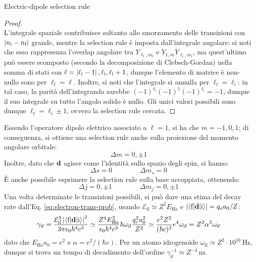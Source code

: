 \begin{theorem}{Electric-dipole selection rule}{}
\begin{proof}
\begin{equation*}
		\end{equation*}
		L'integrale spaziale contribuisce soltanto allo smorzamento delle transizioni con $ \left\lvert n_\text{i} - n_\text{f}\right\rvert $ grande, mentre la selection rule è imposta dall'integrale angolare: si noti che esso rappresenza l'overlap angolare tra $ Y_{\ell_\text{f} , m_\text{f}} $ e $ Y_{1,m} Y_{\ell_\text{i} , m_\text{i}} $, ma quest'ultimo può essere scomposto (secondo la decomposizione di Clebsch-Gordan) nella somma di stati con $ \ell = \left\lvert\ell_\text{i} - 1\right\rvert, \ell_\text{i}, \ell_\text{i} + 1 $, dunque l'elemento di matrice è non-nullo sono per $ \ell_\text{f} = \ell $. Inoltre, si noti che l'integrale si annulla per $ \ell_\text{f} = \ell_\text{i} $: in tal caso, la parità dell'integranda sarebbe $ (-1)^{\ell_\text{i}} (-1)^1 (-1)^{\ell_\text{i}} = -1 $, dunque il suo integrale su tutto l'angolo solido è nullo. Gli unici valori possibili sono dunque $ \ell_\text{f} = \ell_\text{i} \pm 1 $, ovvero la selection rule cercata.
	\end{proof}
\end{theorem}

Essendo l'operatore dipolo elettrico associato a $ \ell = 1 $, si ha che $ m = -1,0,1 $; di conseguenza, si ottiene una selection rule anche sulla proiezione del momento angolare orbitale:
\begin{equation}
	\Delta m = 0, \pm 1
	\label{eq:1-e-el-dip-tr-m}
\end{equation}
Inoltre, dato che $ \mathbf{d} $ agisce come l'identità sullo spazio degli spin, si hanno:
\begin{equation}
	\Delta s = 0
	\qquad \qquad
	\Delta m_s = 0
	\label{eq:1-e-el-dip-tr-spin}
\end{equation}
È anche possibile esprimere la selection rule sulla base accoppiata, ottenendo:
\begin{equation}
	\Delta j = 0 , \pm 1
	\qquad \qquad
	\Delta m_j = 0 , \pm 1
\end{equation}
Una volta determinate le transizioni possibili, si può dare una stima del decay rate dall'Eq. \ref{eq:electron-trans-prob}, usando $ \mathcal{E}_\text{if} \simeq Z^2 E_\text{Ha} $ e $ \left\lvert\braket{\text{f} | \mathbf{d} | \text{i}}\right\rvert = q_e a_0 / Z $:
\begin{equation}
	\gamma_\text{if} = \frac{\mathcal{E}_\text{if}^3 \left\lvert\braket{\text{f} | \mathbf{d} | \text{i}}\right\rvert^2}{3\pi \epsilon_0 \hbar^4 c^3} \simeq \frac{Z^4 E_\text{Ha}^2}{\epsilon_0 \hbar^4 c^3} \hbar \omega_\text{if} \frac{q_e^2 a_0^2}{Z^2} \simeq \frac{e^2 Z^2}{(\hbar c)^3} e^4 \omega_\text{if} = Z^2 \alpha^3 \omega_\text{if}
	\label{eq:electric-dipole-decay-rate}
\end{equation}
dato che $ E_\text{Ha} a_0 = e^2 $ e $ \alpha = e^2 / (\hbar c) $. Per un atomo idrogenoide $ \omega_\text{if} \simeq Z^2 \cdot 10^{16} \,\text{Hz} $, dunque si trova un tempo di decadimento dell'ordine $ \gamma_\text{if}^{-1} \simeq Z^{-4} \,\text{ns} $.

